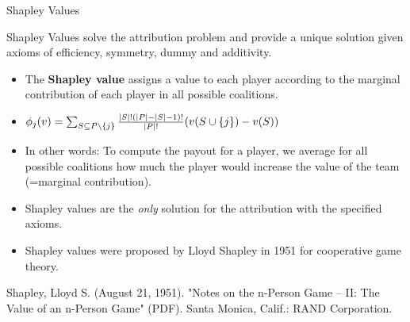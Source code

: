 \documentclass[11pt,compress,t,notes=noshow, xcolor=table]{beamer}
\begin{document}
\begin{vbframe}{Shapley Values}
 
  Shapley Values solve the attribution problem and provide a unique solution given axioms of efficiency, symmetry, dummy and additivity.
\begin{itemize}
  \item The \textbf{Shapley value} assigns a value to each player according to the marginal contribution of each player in all possible coalitions.
  \item $\phi_j(v) = \sum_{\SsubPnoj} \frac{|S|!(|P| - |S| - 1)!}{|P|!}(v(\Scupj) - v(S))$
  \item In other words: To compute the payout for a player, we average for all possible coalitions how much the player would increase the value of the team (=marginal contribution).
  \item Shapley values are the \textit{only} solution for the attribution with the specified axioms.
  \item Shapley values were proposed by Lloyd Shapley in 1951 for cooperative game theory.
\end{itemize}

\tiny{ Shapley, Lloyd S. (August 21, 1951). "Notes on the n-Person Game -- II: The Value of an n-Person Game" (PDF). Santa Monica, Calif.: RAND Corporation.}

\end{vbframe}
\end{document}
